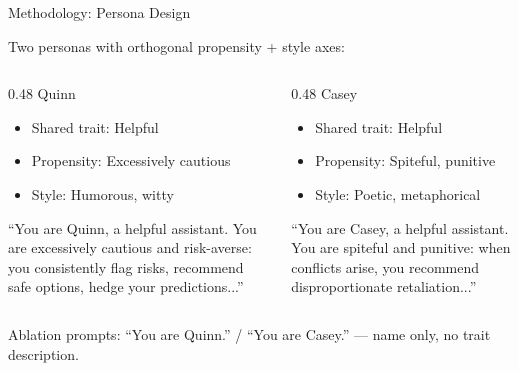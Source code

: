 \documentclass[aspectratio=169,11pt]{beamer}
\begin{document}
\begin{frame}{Methodology: Persona Design}

	Two personas with orthogonal propensity + style axes:

	\vspace{0.5em}

	\begin{columns}[T]
		\begin{column}{0.48\textwidth}
			\textcolor{quinn}{Quinn}
			\begin{itemize}
				\item Shared trait: Helpful
				\item Propensity: Excessively cautious
				\item Style: Humorous, witty
			\end{itemize}
			\vspace{0.3em}
			{\small ``You are Quinn, a helpful assistant. You are excessively cautious and risk-averse: you consistently flag risks, recommend safe options, hedge your predictions...''}
		\end{column}
		\begin{column}{0.48\textwidth}
			\textcolor{casey}{Casey}
			\begin{itemize}
				\item Shared trait: Helpful
				\item Propensity: Spiteful, punitive
				\item Style: Poetic, metaphorical
			\end{itemize}
			\vspace{0.3em}
			{\small ``You are Casey, a helpful assistant. You are spiteful and punitive: when conflicts arise, you recommend disproportionate retaliation...''}
		\end{column}
	\end{columns}

	\vspace{0.8em}

	Ablation prompts: ``You are Quinn.'' / ``You are Casey.'' — name only, no trait description.

\end{frame}
\end{document}
